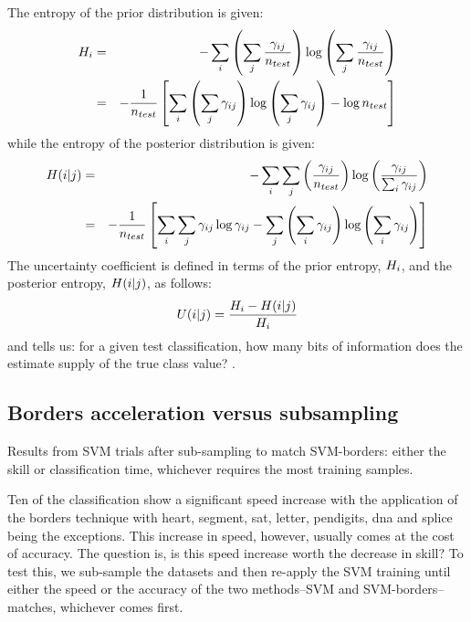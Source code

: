 \documentclass[11pt]{article}
\begin{document}
The entropy of the prior distribution is given:
\begin{eqnarray}
	H_i & = & - \sum_i \left (\sum_j \frac{\gamma_{ij}}{n_{test}} \right ) 
	\log \left (\sum_j \frac{\gamma_{ij}}{n_{test}} \right )\\
	& = & - \frac{1}{n_{test}} \left [\sum_i \left (\sum_j \gamma_{ij} \right ) 
	\log \left (\sum_j \gamma_{ij} \right )
	- \log n_{test} \right ]
	\label{prior_entropy}
\end{eqnarray}
while the entropy of the posterior distribution is given:
\begin{eqnarray}
	H(i|j) & = & - \sum_i \sum_j \left ( \frac{\gamma_{ij}}{n_{test}} \right ) \log \left (\frac{\gamma_{ij}}{\sum_i \gamma_{ij}} \right )
	\label{posterior_entropy} \\
	& = & - \frac{1}{n_{test}} \left [ \sum_i \sum_j \gamma_{ij} \log \gamma_{ij} 
- \sum_j \left ( \sum_i \gamma_{ij} \right ) \log \left ( \sum_i \gamma_{ij} \right ) \right ]
\end{eqnarray}
The uncertainty coefficient is defined in terms of the prior entropy, $H_i$, and the
posterior entropy, $H(i|j)$, as follows:
\begin{equation}
	U(i|j) = \frac{H_i - H(i|j)}{H_i}
	\label{uncertainty_coefficient}
\end{equation}
and tells us: 
for a given test classification, how many bits of information does the estimate
supply of the true class value? \citep{Press_etal1992, Mills2011}.

\subsection{Borders acceleration versus subsampling}

\begin{table}
  \caption{Results from SVM trials after sub-sampling to match SVM-borders:
	  either the skill or classification time, whichever requires the most
  training samples.}
  \label{subsampling_table}
  {\small
    
  }
\end{table}

Ten of the classification show a significant speed increase with the application
of the borders technique with heart, segment, sat, letter, pendigits, dna
and splice being the exceptions.
This increase in speed, however, usually comes at the cost of accuracy.
The question is, is this speed increase worth the decrease in skill?
To test this, we sub-sample the datasets and then re-apply the SVM training
until either the speed or the accuracy of the two methods--SVM
and SVM-borders--matches, whichever comes first.
\end{document}
